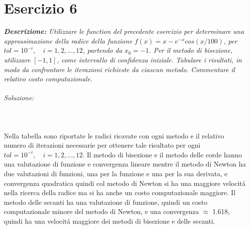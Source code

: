 \section{Esercizio 6}

\textit{\textbf{Descrizione:} Utilizzare le function del precedente esercizio per determinare una approssimazione della radice della funzione
$f(x) = x - e^{-x}cos(x/100)$,  per $tol = 10^{-i}, \quad i=1, 2,...,12$, partendo da $x_{0} = -1$. Per il metodo di bisezione,
utilizzare $[-1, 1]$, come intervallo di confidenza iniziale. Tabulare i risultati, in modo da confrontare le iterazioni richieste da ciascun metodo. Commentare il relativo costo computazionale.}\\~\\
\emph{Soluzione: }\\~\\

\\~\\
Nella tabella sono riportate le radici ricavate con ogni metodo e il relativo numero di iterazioni necessarie per ottenere tale risultato per ogni $tol = 10^{-i}, \quad i=1, 2,...,12$.\newline
Il metodo di bisezione e il metodo delle corde hanno una valutazione di funzione e convergenza lineare mentre il metodo di Newton ha due valutazioni di funzioni, una per la funzione e una per la sua derivata, e convergenza quadratica quindi col metodo di Newton si ha una maggiore velocit\'a nella ricerca della radice ma si ha anche un costo computazionale maggiore. Il metodo delle secanti ha una valutazione di funzione, quindi un costo computazionale minore del metodo di Newton,  e una convergenza $\approx$ 1.618, quindi ha una velocit\'a maggiore dei metodi di bisezione e delle secanti.